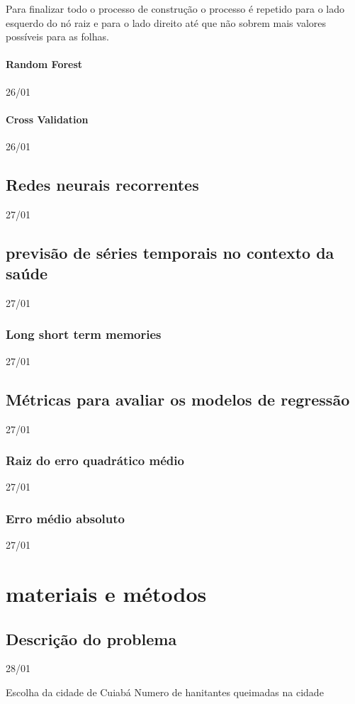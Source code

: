 \documentclass[
  12pt,		%
  a4paper,	%
  openright,%
  oneside,	%
  chapter=TITLE,		%
  section=TITLE,		%
  english,	%
  french,	%
  spanish,	%
  brazil	%
]{abntex2}
\begin{document}
    Para finalizar todo o processo de construção o processo é repetido para o lado esquerdo do nó raiz e para o lado direito até que não sobrem mais
    valores possíveis para as folhas.

    \subsubsection{Random Forest}
    26/01

    
    \subsubsection{Cross Validation}
    26/01

    \section{Redes neurais recorrentes}
    27/01
    \section{previsão de séries temporais no contexto da saúde}
    \label{LSTM}
    27/01
    \subsection{Long short term memories}
    27/01
    \section{Métricas para avaliar os modelos de regressão}
    27/01
    \subsection{Raiz do erro quadrático médio}
    27/01
    \subsection{Erro médio absoluto}
    27/01
    \chapter{materiais e métodos}

    \section{Descrição do problema}
    28/01

    Escolha da cidade de Cuiabá
    Numero de hanitantes
    queimadas na cidade
\end{document}
